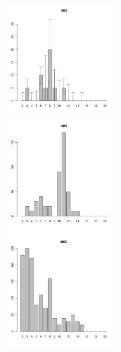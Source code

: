 	\begin{figure}[hp]

	\begin{minipage}[b]{.3\linewidth}
	\begin{center}
	\includegraphics[width=60mm]{../White_Sea/Luvenga_Goreliy/midlow2_1992_.pdf}	
	\end{center}
	\end{minipage}
	\hfil %
	\begin{minipage}[b]{.3\linewidth}
	\begin{center}
	\includegraphics[width=60mm]{../White_Sea/Luvenga_Goreliy/midlow2_1996_.pdf}
	\end{center}
	\end{minipage}
	\hfil %
	\begin{minipage}[b]{.3\linewidth}
	\begin{center}
\includegraphics[width=60mm]{../White_Sea/Luvenga_Goreliy/midlow2_2000_.pdf}

\end{center}
\end{minipage}
\end{figure}
